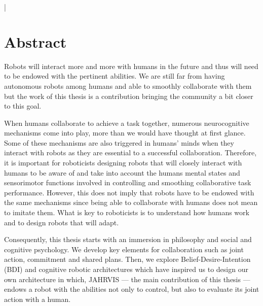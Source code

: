 \documentclass[english,a4paper,11pt,twoside]{StyleThese}
\begin{document}
\lstMakeShortInline[columns=fixed,breaklines=false]|
\makeflyleaf

\cleardoublepage

\dominitoc


 \cleardoublepage


\chapter*{Abstract}

Robots will interact more and more with humans in the future and thus will need to be endowed with the pertinent abilities. We are still far from having autonomous robots among humans and able to smoothly collaborate with them but the work of this thesis is a contribution bringing the community a bit closer to this goal. 


When humans collaborate to achieve a task together, numerous neurocognitive mechanisms come into play, more than we would have thought at first glance. Some of these mechanisms are also triggered in humans’ minds when they interact with robots as they are essential to a successful collaboration. Therefore, it is important for roboticists designing robots that will closely interact with humans to be aware of and take into account the humans mental states and sensorimotor functions involved in controlling and smoothing collaborative task performance. However, this does not imply that robots have to be endowed with the same mechanisms since being able to collaborate with humans does not mean to imitate them. What is key to roboticists is to understand how humans work and to design  robots that will adapt. 


Consequently, this thesis starts with an immersion in philosophy and social and cognitive psychology. We develop key elements for collaboration such as joint action, commitment and shared plans. Then, we explore Belief-Desire-Intention (BDI) and cognitive robotic architectures  which have inspired us to design our own architecture in which, JAHRVIS —  the main contribution of this thesis — endows a robot with the abilities not only to control, but also to evaluate its joint action with a human. 
\end{document}
